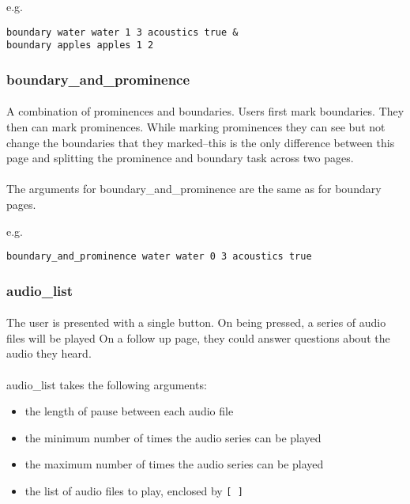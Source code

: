 e.g.

\begin{lstlisting}
boundary water water 1 3 acoustics true &
boundary apples apples 1 2
\end{lstlisting}


\subsubsection{boundary\_and\_prominence}

\paragraph{}
A combination of prominences and boundaries.  Users first mark boundaries.  They then can mark prominences.  While marking prominences they can see but not change the boundaries that they marked--this is the only difference between this page and splitting the prominence and boundary task across two pages.

\paragraph{}
The arguments for boundary\_and\_prominence are the same as for boundary pages.

e.g.
\begin{lstlisting}
boundary_and_prominence water water 0 3 acoustics true
\end{lstlisting}

\subsubsection{audio\_list}

\paragraph{}
The user is presented with a single button.  On being pressed, a series of audio files will be played  On a follow up page, they could answer questions about the audio they heard.

\paragraph{}
audio\_list takes the following arguments:

\begin{itemize}
\item the length of pause between each audio file
\item the minimum number of times the audio series can be played
\item the maximum number of times the audio series can be played
\item the list of audio files to play, enclosed by \texttt{[ ]}
\end{itemize}

